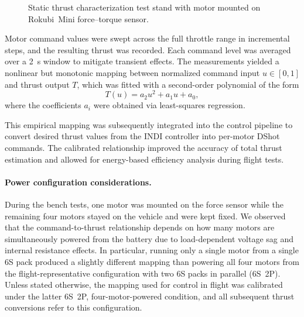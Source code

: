 \begin{figure}[h]
\caption{Static thrust characterization test stand with motor mounted on Rokubi~Mini force–torque sensor.}
\label{fig:force_test_stand}
\end{figure}

Motor command values were swept across the full throttle range in incremental steps, and the resulting thrust was recorded.  
Each command level was averaged over a \SI{2}{\second} window to mitigate transient effects.  
The measurements yielded a nonlinear but monotonic mapping between normalized command input $u \in [0,1]$ and thrust output $T$, which was fitted with a second-order polynomial of the form
\begin{equation}
T(u) = a_2 u^2 + a_1 u + a_0,
\end{equation}
where the coefficients $a_i$ were obtained via least-squares regression.

This empirical mapping was subsequently integrated into the control pipeline to convert desired thrust values from the INDI controller into per-motor DShot commands.  
The calibrated relationship improved the accuracy of total thrust estimation and allowed for energy-based efficiency analysis during flight tests.

\paragraph{Power configuration considerations.}
During the bench tests, one motor was mounted on the force sensor while the remaining four motors stayed on the vehicle and were kept fixed. We observed that the command-to-thrust relationship depends on how many motors are simultaneously powered from the battery due to load-dependent voltage sag and internal resistance effects. In particular, running only a single motor from a single 6S pack produced a slightly different mapping than powering all four motors from the flight-representative configuration with two 6S packs in parallel (6S~2P). Unless stated otherwise, the mapping used for control in flight was calibrated under the latter 6S~2P, four-motor-powered condition, and all subsequent thrust conversions refer to this configuration.

